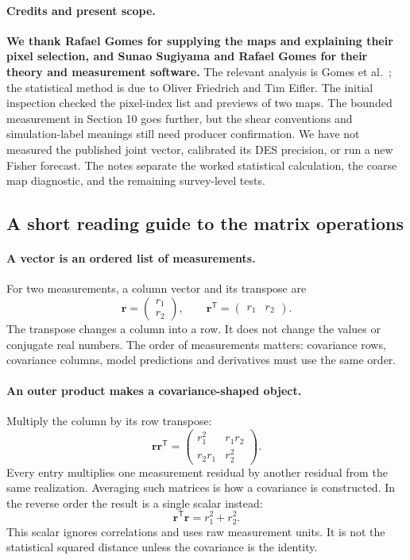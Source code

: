 \documentclass[11pt]{article}
\newcommand{\T}{^{\mathsf{T}}}
\begin{document}
\paragraph{Credits and present scope.}
\textbf{We thank Rafael Gomes for supplying the maps and explaining their
pixel selection, and Sunao Sugiyama and Rafael Gomes for their theory and
measurement software.} The relevant analysis is Gomes et al.~\cite{gomes};
the statistical method is due to Oliver Friedrich and Tim Eifler.
The initial inspection checked the pixel-index list and previews of two
maps. The bounded measurement in Section 10 goes further, but the shear
conventions and simulation-label meanings still need producer confirmation.
We have not measured the published joint vector, calibrated its DES precision,
or run a new Fisher forecast. The notes separate the worked statistical
calculation, the coarse map diagnostic, and the remaining survey-level tests.


\subsection{A short reading guide to the matrix operations}
\label{sec:matrix-language}
\paragraph{A vector is an ordered list of measurements.}
For two measurements, a column vector and its transpose are
\begin{equation}
 \boldsymbol r=\begin{pmatrix}r_1\\r_2\end{pmatrix},
 \qquad \boldsymbol r\T=\begin{pmatrix}r_1&r_2\end{pmatrix}.
\end{equation}
The transpose changes a column into a row. It does not change the values
or conjugate real numbers. The order of measurements matters: covariance
rows, covariance columns, model predictions and derivatives must use the
same order.

\paragraph{An outer product makes a covariance-shaped object.}
Multiply the column by its row transpose:
\begin{equation}
 \boldsymbol r\boldsymbol r\T=
 \begin{pmatrix}r_1^2&r_1r_2\\r_2r_1&r_2^2\end{pmatrix}.
\end{equation}
Every entry multiplies one measurement residual by another residual from
the same realization. Averaging such matrices is how a covariance is
constructed. In the reverse order the result is a single scalar instead:
\begin{equation}
 \boldsymbol r\T\boldsymbol r=r_1^2+r_2^2.
\end{equation}
This scalar ignores correlations and uses raw measurement units. It is
not the statistical squared distance unless the covariance is the identity.
\end{document}
